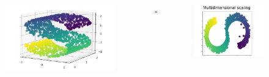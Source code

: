 \documentclass{beamer}
\begin{document}
\begin{frame}
    \begin{columns}
        \begin{column}{0.4\textwidth}
            \begin{figure}
                \includegraphics[width=1.4\textwidth]{mds_1.png}
                
            \end{figure}   
        \end{column}
        \begin{column}{0.01\textwidth}
            \huge{$\Longrightarrow$}
            
        \end{column}
        \begin{column}{0.4\textwidth}
            \begin{figure}
            \includegraphics[width=\textwidth]{mds_2.png}
            
        \end{figure}   
        \end{column}
    \end{columns}
    \centering
    \vfill
    \tiny{\cite{scikit-learn}}

\end{frame}
\end{document}
